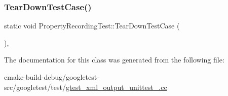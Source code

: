 \mbox{\label{classPropertyRecordingTest_ac0d2d47efbdc4399777dffca6071d15d}} 
\subsubsection{\texorpdfstring{TearDownTestCase()}{TearDownTestCase()}}
{\footnotesize\ttfamily static void Property\+Recording\+Test\+::\+Tear\+Down\+Test\+Case (\begin{DoxyParamCaption}{ }\end{DoxyParamCaption})\hspace{0.3cm}{\ttfamily [inline]}, {\ttfamily [static]}}



The documentation for this class was generated from the following file\+:\begin{DoxyCompactItemize}
\item 
cmake-\/build-\/debug/googletest-\/src/googletest/test/\mbox{\hyperlink{gtest__xml__output__unittest___8cc}{gtest\+\_\+xml\+\_\+output\+\_\+unittest\+\_\+.\+cc}}\end{DoxyCompactItemize}
